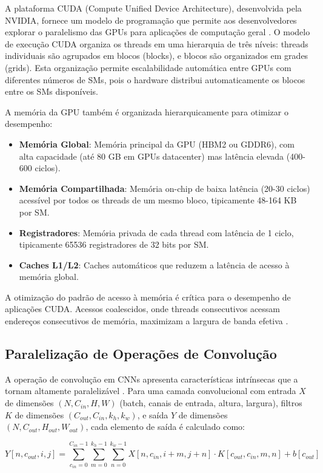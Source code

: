 A plataforma CUDA (Compute Unified Device Architecture), desenvolvida pela NVIDIA, fornece um modelo de programação que permite aos desenvolvedores explorar o paralelismo das GPUs para aplicações de computação geral \cite{CUDA_Programming}. O modelo de execução CUDA organiza os threads em uma hierarquia de três níveis: threads individuais são agrupados em blocos (blocks), e blocos são organizados em grades (grids). Esta organização permite escalabilidade automática entre GPUs com diferentes números de SMs, pois o hardware distribui automaticamente os blocos entre os SMs disponíveis.

A memória da GPU também é organizada hierarquicamente para otimizar o desempenho:
\begin{itemize}
    \item \textbf{Memória Global}: Memória principal da GPU (HBM2 ou GDDR6), com alta capacidade (até 80 GB em GPUs datacenter) mas latência elevada (400-600 ciclos).
    \item \textbf{Memória Compartilhada}: Memória on-chip de baixa latência (20-30 ciclos) acessível por todos os threads de um mesmo bloco, tipicamente 48-164 KB por SM.
    \item \textbf{Registradores}: Memória privada de cada thread com latência de 1 ciclo, tipicamente 65536 registradores de 32 bits por SM.
    \item \textbf{Caches L1/L2}: Caches automáticos que reduzem a latência de acesso à memória global.
\end{itemize}

A otimização do padrão de acesso à memória é crítica para o desempenho de aplicações CUDA. Acessos coalescidos, onde threads consecutivos acessam endereços consecutivos de memória, maximizam a largura de banda efetiva \cite{Jorda_cuDNN}.

\subsection{Paralelização de Operações de Convolução}

A operação de convolução em CNNs apresenta características intrínsecas que a tornam altamente paralelizável \cite{cuConv}. Para uma camada convolucional com entrada $X$ de dimensões $(N, C_{in}, H, W)$ (batch, canais de entrada, altura, largura), filtros $K$ de dimensões $(C_{out}, C_{in}, k_h, k_w)$, e saída $Y$ de dimensões $(N, C_{out}, H_{out}, W_{out})$, cada elemento de saída é calculado como:

\begin{equation}
Y[n, c_{out}, i, j] = \sum_{c_{in}=0}^{C_{in}-1} \sum_{m=0}^{k_h-1} \sum_{n=0}^{k_w-1} X[n, c_{in}, i+m, j+n] \cdot K[c_{out}, c_{in}, m, n] + b[c_{out}]
\end{equation}

